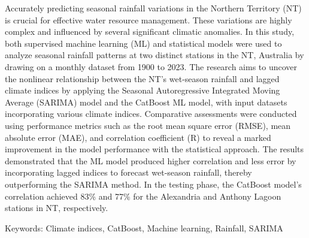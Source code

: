 Accurately predicting seasonal rainfall variations in the Northern Territory (NT) is crucial for effective water resource management. These variations are highly complex and influenced by several significant climatic anomalies. In this study, both supervised machine learning (ML) and statistical models were used to analyze seasonal rainfall patterns at two distinct stations in the NT, Australia by drawing on a monthly dataset from 1900 to 2023. The research aims to uncover the nonlinear relationship between the NT's wet-season rainfall and lagged climate indices by applying the Seasonal Autoregressive Integrated Moving Average (SARIMA) model and the CatBoost ML model, with input datasets incorporating various climate indices. Comparative assessments were conducted using performance metrics such as the root mean square error (RMSE), mean absolute error (MAE), and correlation coefficient (R) to reveal a marked improvement in the model performance with the statistical approach. The results demonstrated that the ML model produced higher correlation and less error by incorporating lagged indices to forecast wet-season rainfall, thereby outperforming the SARIMA method. In the testing phase, the CatBoost model’s correlation achieved 83\% and 77\% for the Alexandria and Anthony Lagoon stations in NT, respectively. 
 
Keywords: Climate indices, CatBoost, Machine learning, Rainfall, SARIMA
\newpage{}
